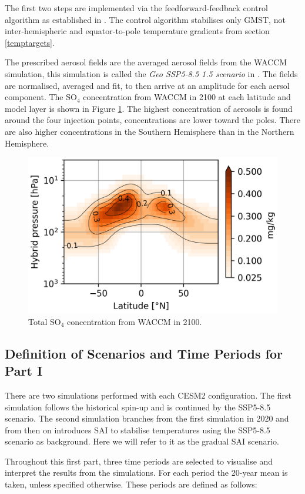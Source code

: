 The first two steps are implemented via the feedforward-feedback control algorithm as established in \textcite{kravitz2017}. The control algorithm stabilises only GMST, not inter-hemispheric and equator-to-pole temperature gradients from section \ref{temptargets}.

The prescribed aerosol fields are the averaged aerosol fields from the WACCM simulation, this simulation is called the \textit{Geo SSP5-8.5 1.5 scenario} in \textcite{tilmes2020}. The fields are normalised, averaged and fit, to then arrive at an amplitude for each aersol component. The SO$_4$ concentration from WACCM in 2100 at each latitude and model layer is shown in Figure \ref{fig:strataero}. The highest concentration of aerosols is found around the four injection points, concentrations are lower toward the poles. There are also higher concentrations in the Southern Hemisphere than in the Northern Hemisphere.

\begin{figure}[H]
	\centering
	\includegraphics[width=0.6\linewidth]{images/strataero.png}
	\caption{Total SO$_4$ concentration from WACCM in 2100.}
	\label{fig:strataero}
\end{figure}

\subsection{Definition of Scenarios and Time Periods for Part I}
There are two simulations performed with each CESM2 configuration. The first simulation follows the historical spin-up and is continued by the SSP5-8.5 scenario. The second simulation branches from the first simulation in 2020 and from then on introduces SAI to stabilise temperatures using the SSP5-8.5 scenario as background. Here we will refer to it as the gradual SAI scenario. 

Throughout this first part, three time periods are selected to visualise and interpret the results from the simulations. For each period the 20-year mean is taken, unless specified otherwise. These periods are defined as follows:

